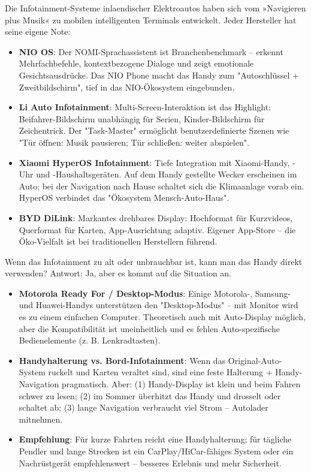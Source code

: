 
Die Infotainment-Systeme inlaendischer Elektroautos haben sich vom »Navigieren plus Musik« zu mobilen intelligenten Terminals entwickelt. Jeder Hersteller hat seine eigene Note:

\begin{itemize}
  \item \textbf{NIO OS}: Der NOMI-Sprachassistent ist Branchenbenchmark – erkennt Mehrfachbefehle, kontextbezogene Dialoge und zeigt emotionale Gesichtsausdrücke. Das NIO Phone macht das Handy zum "Autoschlüssel + Zweitbildschirm", tief in das NIO-Ökosystem eingebunden.
  \item \textbf{Li Auto Infotainment}: Multi-Screen-Interaktion ist das Highlight: Beifahrer-Bildschirm unabhängig für Serien, Kinder-Bildschirm für Zeichentrick. Der "Task-Master" ermöglicht benutzerdefinierte Szenen wie "Tür öffnen: Musik pausieren; Tür schließen: weiter abspielen".
  \item \textbf{Xiaomi HyperOS Infotainment}: Tiefe Integration mit Xiaomi-Handy, -Uhr und -Haushaltsgeräten. Auf dem Handy gestellte Wecker erscheinen im Auto; bei der Navigation nach Hause schaltet sich die Klimaanlage vorab ein. HyperOS verbindet das "Ökosystem Mensch-Auto-Haus".
  \item \textbf{BYD DiLink}: Markantes drehbares Display: Hochformat für Kurzvideos, Querformat für Karten, App-Ausrichtung adaptiv. Eigener App-Store – die Öko-Vielfalt ist bei traditionellen Herstellern führend.
\end{itemize}


Wenn das Infotainment zu alt oder unbrauchbar ist, kann man das Handy direkt verwenden? Antwort: Ja, aber es kommt auf die Situation an.

\begin{itemize}
  \item \textbf{Motorola Ready For / Desktop-Modus}: Einige Motorola-, Samsung- und Huawei-Handys unterstützen den "Desktop-Modus" – mit Monitor wird es zu einem einfachen Computer. Theoretisch auch mit Auto-Display möglich, aber die Kompatibilität ist uneinheitlich und es fehlen Auto-spezifische Bedienelemente (z. B. Lenkradtasten).
  \item \textbf{Handyhalterung vs. Bord-Infotainment}: Wenn das Original-Auto-System ruckelt und Karten veraltet sind, sind eine feste Halterung + Handy-Navigation pragmatisch. Aber: (1) Handy-Display ist klein und beim Fahren schwer zu lesen; (2) im Sommer überhitzt das Handy und drosselt oder schaltet ab; (3) lange Navigation verbraucht viel Strom – Autolader mitnehmen.
  \item \textbf{Empfehlung}: Für kurze Fahrten reicht eine Handyhalterung; für tägliche Pendler und lange Strecken ist ein CarPlay/HiCar-fähiges System oder ein Nachrüstgerät empfehlenswert – besseres Erlebnis und mehr Sicherheit.
\end{itemize}

